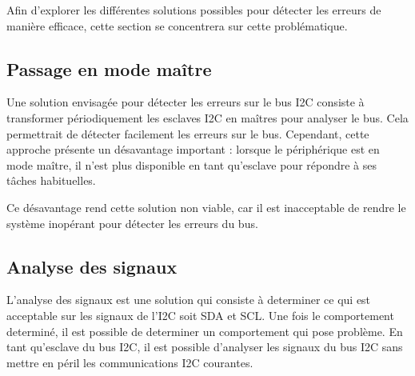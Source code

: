Afin d'explorer les différentes solutions possibles pour détecter les erreurs de manière efficace, cette section se concentrera sur cette problématique.

\subsection{Passage en mode maître}

Une solution envisagée pour détecter les erreurs sur le bus I2C consiste à transformer périodiquement les esclaves I2C en maîtres pour analyser le bus.
Cela permettrait de détecter facilement les erreurs sur le bus.
Cependant, cette approche présente un désavantage important : lorsque le périphérique est en mode maître, il n'est plus disponible en tant qu'esclave pour répondre à ses tâches habituelles.

Ce désavantage rend cette solution non viable, car il est inacceptable de rendre le système inopérant pour détecter les erreurs du bus.

\subsection{Analyse des signaux}

L'analyse des signaux est une solution qui consiste à determiner ce qui est acceptable sur les signaux de l'I2C soit SDA et SCL. Une fois le comportement determiné, il est possible de determiner un comportement qui pose problème. En tant qu'esclave du bus I2C, il est possible d'analyser les signaux du bus I2C sans mettre en péril les communications I2C courantes.